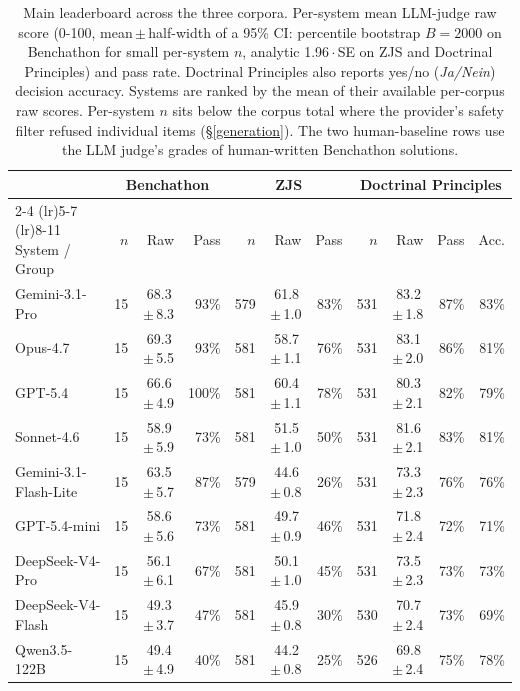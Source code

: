 \begin{table}[!t]
\centering\footnotesize
\caption{Main leaderboard across the three corpora. Per-system mean LLM-judge raw score (0-100, mean\,$\pm$\,half-width of a 95\% CI: percentile bootstrap $B=2000$ on Benchathon for small per-system $n$, analytic 1.96\,$\cdot$\,SE on ZJS and Doctrinal Principles) and pass rate. Doctrinal Principles also reports yes/no (\emph{Ja/Nein}) decision accuracy. Systems are ranked by the mean of their available per-corpus raw scores. Per-system $n$ sits below the corpus total where the provider's safety filter refused individual items (\S\ref{generation}). The two human-baseline rows use the LLM judge's grades of human-written Benchathon solutions.}
\label{tbl-main-leaderboard}
\setlength{\tabcolsep}{4pt}
\begin{tabular*}{\textwidth}{@{\extracolsep{\fill}} l rrr rrr rrrr @{}}
\toprule
 & \multicolumn{3}{c}{Benchathon} & \multicolumn{3}{c}{ZJS} & \multicolumn{4}{c}{Doctrinal Principles} \\
\cmidrule(lr){2-4} \cmidrule(lr){5-7} \cmidrule(lr){8-11}
System / Group & $n$ & Raw & Pass & $n$ & Raw & Pass & $n$ & Raw & Pass & Acc. \\
\midrule
Gemini-3.1-Pro & 15 & 68.3\,$\pm$\,8.3 & 93\% & 579 & 61.8\,$\pm$\,1.0 & 83\% & 531 & 83.2\,$\pm$\,1.8 & 87\% & 83\% \\
Opus-4.7 & 15 & 69.3\,$\pm$\,5.5 & 93\% & 581 & 58.7\,$\pm$\,1.1 & 76\% & 531 & 83.1\,$\pm$\,2.0 & 86\% & 81\% \\
GPT-5.4 & 15 & 66.6\,$\pm$\,4.9 & 100\% & 581 & 60.4\,$\pm$\,1.1 & 78\% & 531 & 80.3\,$\pm$\,2.1 & 82\% & 79\% \\
Sonnet-4.6 & 15 & 58.9\,$\pm$\,5.9 & 73\% & 581 & 51.5\,$\pm$\,1.0 & 50\% & 531 & 81.6\,$\pm$\,2.1 & 83\% & 81\% \\
Gemini-3.1-Flash-Lite & 15 & 63.5\,$\pm$\,5.7 & 87\% & 579 & 44.6\,$\pm$\,0.8 & 26\% & 531 & 73.3\,$\pm$\,2.3 & 76\% & 76\% \\
GPT-5.4-mini & 15 & 58.6\,$\pm$\,5.6 & 73\% & 581 & 49.7\,$\pm$\,0.9 & 46\% & 531 & 71.8\,$\pm$\,2.4 & 72\% & 71\% \\
DeepSeek-V4-Pro & 15 & 56.1\,$\pm$\,6.1 & 67\% & 581 & 50.1\,$\pm$\,1.0 & 45\% & 531 & 73.5\,$\pm$\,2.3 & 73\% & 73\% \\
DeepSeek-V4-Flash & 15 & 49.3\,$\pm$\,3.7 & 47\% & 581 & 45.9\,$\pm$\,0.8 & 30\% & 530 & 70.7\,$\pm$\,2.4 & 73\% & 69\% \\
Qwen3.5-122B & 15 & 49.4\,$\pm$\,4.9 & 40\% & 581 & 44.2\,$\pm$\,0.8 & 25\% & 526 & 69.8\,$\pm$\,2.4 & 75\% & 78\% \\

\end{tabular*}
\end{table}
